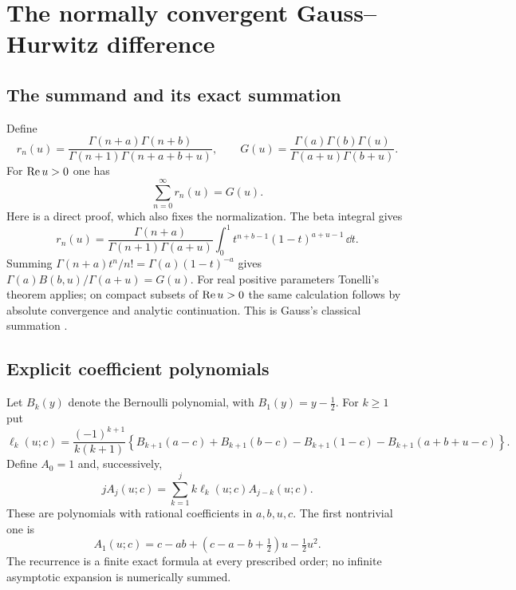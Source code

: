\section{The normally convergent Gauss--Hurwitz difference}\label{sec:subtraction}

\subsection{The summand and its exact summation}
Define
\begin{equation}\label{eq:rn}
 r_n(u)=\frac{\Gamma(n+a)\Gamma(n+b)}
 {\Gamma(n+1)\Gamma(n+a+b+u)},\qquad
 G(u)=\frac{\Gamma(a)\Gamma(b)\Gamma(u)}
 {\Gamma(a+u)\Gamma(b+u)}.
\end{equation}
For $\operatorname{Re} u>0$ one has
\begin{equation}\label{eq:gauss}
 \sum_{n=0}^\infty r_n(u)=G(u).
\end{equation}
Here is a direct proof, which also fixes the normalization.  The beta
integral gives
\[
 r_n(u)=\frac{\Gamma(n+a)}{\Gamma(n+1)\Gamma(a+u)}
 \int_0^1 t^{n+b-1}(1-t)^{a+u-1}\,\dd t.
\]
Summing $\Gamma(n+a)t^n/n!=\Gamma(a)(1-t)^{-a}$ gives
$\Gamma(a)B(b,u)/\Gamma(a+u)=G(u)$.
For real positive parameters Tonelli's theorem applies; on compact subsets
of $\operatorname{Re} u>0$ the same calculation follows by absolute convergence and
analytic continuation.  This is Gauss's classical summation
\cite[15.4.20]{dlmf-gauss}.

\subsection{Explicit coefficient polynomials}
Let $B_k(y)$ denote the Bernoulli polynomial, with
$B_1(y)=y-\tfrac12$.  For $k\ge1$ put
\begin{equation}\label{eq:ell}
 \ell_k(u;c)=\frac{(-1)^{k+1}}{k(k+1)}
 \left\{
 B_{k+1}(a-c)+B_{k+1}(b-c)-B_{k+1}(1-c)
 -B_{k+1}(a+b+u-c)\right\}.
\end{equation}
Define $A_0=1$ and, successively,
\begin{equation}\label{eq:Arec}
 j A_j(u;c)=\sum_{k=1}^j k\ell_k(u;c)A_{j-k}(u;c).
\end{equation}
These are polynomials with rational coefficients in $a,b,u,c$.
The first nontrivial one is
\begin{equation}\label{eq:A1}
 A_1(u;c)=c-ab+(c-a-b+\tfrac12)u-\tfrac12u^2.
\end{equation}
The recurrence is a finite exact formula at every prescribed order; no
infinite asymptotic expansion is numerically summed.

